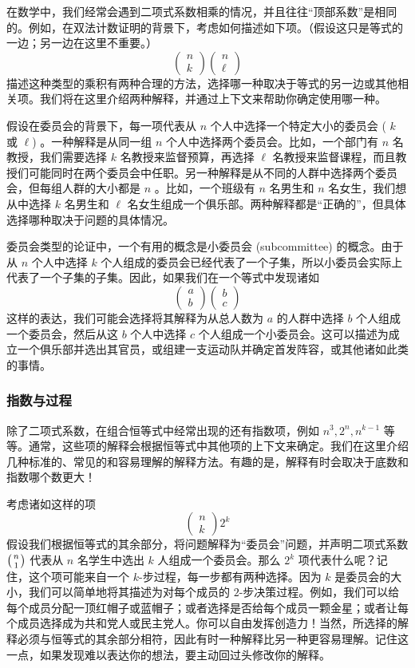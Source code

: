 在数学中，我们经常会遇到二项式系数相乘的情况，并且往往``顶部系数''是相同的。例如，在双法计数证明的背景下，考虑如何描述如下项。（假设这只是等式的一边；另一边在这里不重要。）
\[\begin{pmatrix}n\\k\end{pmatrix}\begin{pmatrix}n\\\ell\end{pmatrix}\]
描述这种类型的乘积有两种合理的方法，选择哪一种取决于等式的另一边或其他相关项。我们将在这里介绍两种解释，并通过上下文来帮助你确定使用哪一种。

假设在委员会的背景下，每一项代表从 $n$ 个人中选择一个特定大小的委员会 ( $k$ 或 $\ell$) 。一种解释是从同一组 $n$ 个人中选择两个委员会。比如，一个部门有 $n$ 名教授，我们需要选择 $k$ 名教授来监督预算，再选择 $\ell$ 名教授来监督课程，而且教授们可能同时在两个委员会中任职。另一种解释是从不同的人群中选择两个委员会，但每组人群的大小都是 $n$ 。比如，一个班级有 $n$ 名男生和 $n$ 名女生，我们想从中选择 $k$ 名男生和 $\ell$ 名女生组成一个俱乐部。两种解释都是``正确的''，但具体选择哪种取决于问题的具体情况。

委员会类型的论证中，一个有用的概念是小委员会 (subcommittee) 的概念。由于从 $n$ 个人中选择 $k$ 个人组成的委员会已经代表了一个子集，所以小委员会实际上代表了一个子集的子集。因此，如果我们在一个等式中发现诸如
\[\begin{pmatrix}a\\b\end{pmatrix}\begin{pmatrix}b\\c\end{pmatrix}\]
这样的表达，我们可能会选择将其解释为从总人数为 $a$ 的人群中选择 $b$ 个人组成一个委员会，然后从这 $b$ 个人中选择 $c$ 个人组成一个小委员会。这可以描述为成立一个俱乐部并选出其官员，或组建一支运动队并确定首发阵容，或其他诸如此类的事情。

\subsubsection*{指数与过程}

除了二项式系数，在组合恒等式中经常出现的还有指数项，例如 $n^3, 2^n, n^{k-1}$ 等等。通常，这些项的解释会根据恒等式中其他项的上下文来确定。我们在这里介绍几种标准的、常见的和容易理解的解释方法。有趣的是，解释有时会取决于底数和指数哪个数更大！

考虑诸如这样的项
\[\begin{pmatrix}n\\k\end{pmatrix}2^k\]
假设我们根据恒等式的其余部分，将问题解释为``委员会''问题，并声明二项式系数 $\big({n \atop 1}\big)$ 代表从 $n$ 名学生中选出 $k$ 人组成一个委员会。那么 $2^k$ 项代表什么呢？记住，这个项可能来自一个 $k$-步过程，每一步都有两种选择。因为 $k$ 是委员会的大小，我们可以简单地将其描述为对每个成员的 $2$-步决策过程。例如，我们可以给每个成员分配一顶红帽子或蓝帽子；或者选择是否给每个成员一颗金星；或者让每个成员选择成为共和党人或民主党人。你可以自由发挥创造力！当然，所选择的解释必须与恒等式的其余部分相符，因此有时一种解释比另一种更容易理解。记住这一点，如果发现难以表达你的想法，要主动回过头修改你的解释。

